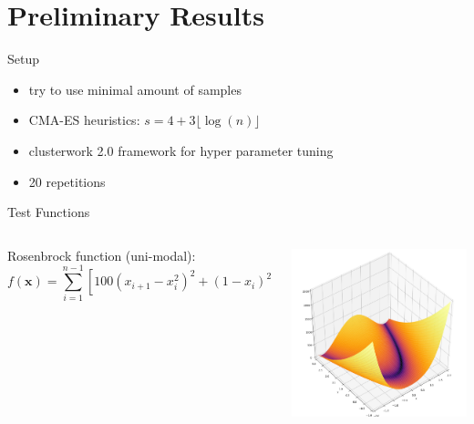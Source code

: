 \documentclass[navbarinfooter, 12pt]{sdqbeamer}
\begin{document}


\section{Preliminary Results}
\begin{frame}{Setup}
\begin{itemize}
\item try to use minimal amount of samples
\item CMA-ES heuristics: $s = 4 + 3 \lfloor \log(n) \rfloor$
\item clusterwork 2.0 framework for hyper parameter tuning
\item 20 repetitions
\end{itemize}
\end{frame}

\begin{frame}{Test Functions}
\begin{columns}[c]
  \begin{column}{5cm}
    Rosenbrock function (uni-modal):
      $$ f(\mathbf{x}) = \sum^{n-1}_{i=1} [100 (x_{i+1} - x_i^2)^2 + (1 - x_i)^2] $$
  \end{column}
  \begin{column}{5cm}
    \includegraphics[height=5cm]{figures/Rosenbrock.png}
  \end{column}
\end{columns}
\end{frame}
\end{document}
